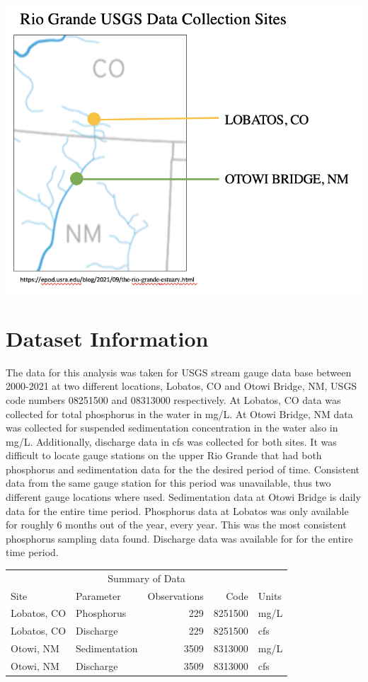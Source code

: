 \documentclass[
  12pt,
]{article}
\begin{document}
\begin{center}\includegraphics[width=0.75\linewidth]{image2_datacollectionsites} \end{center}
\newpage

\hypertarget{dataset-information}{%
\section{Dataset Information}\label{dataset-information}}

The data for this analysis was taken for USGS stream gauge data base
between 2000-2021 at two different locations, Lobatos, CO and Otowi
Bridge, NM, USGS code numbers 08251500 and 08313000 respectively. At
Lobatos, CO data was collected for total phosphorus in the water in
mg/L. At Otowi Bridge, NM data was collected for suspended sedimentation
concentration in the water also in mg/L. Additionally, discharge data in
cfs was collected for both sites. It was difficult to locate gauge
stations on the upper Rio Grande that had both phosphorus and
sedimentation data for the the desired period of time. Consistent data
from the same gauge station for this period was unavailable, thus two
different gauge locations where used. Sedimentation data at Otowi Bridge
is daily data for the entire time period. Phosphorus data at Lobatos was
only available for roughly 6 months out of the year, every year. This
was the most consistent phosphorus sampling data found. Discharge data
was available for for the entire time period.

\begin{table}
\centering
\begin{tabular}[t]{l|l|r|r|l}
\hline
\multicolumn{5}{c}{Summary of Data} \\
\cline{1-5}
Site & Parameter & Observations & Code & Units\\
\hline
Lobatos, CO & Phosphorus & 229 & 8251500 & mg/L\\
\hline
Lobatos, CO & Discharge & 229 & 8251500 & cfs\\
\hline
Otowi, NM & Sedimentation & 3509 & 8313000 & mg/L\\
\hline
Otowi, NM & Discharge & 3509 & 8313000 & cfs\\
\hline
\end{tabular}
\end{table}
\end{document}
